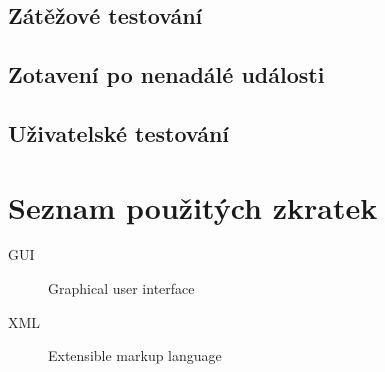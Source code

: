 \documentclass[thesis=B,czech]{FITthesis}[2019/12/23]
\begin{document}
\section{Zátěžové testování}

\section{Zotavení po nenadálé události}

\section{Uživatelské testování}



\begin{conclusion}
\end{conclusion}




\appendix

\chapter{Seznam použitých zkratek}
\begin{description}
	\item[GUI] Graphical user interface
	\item[XML] Extensible markup language
\end{description}
\end{document}
